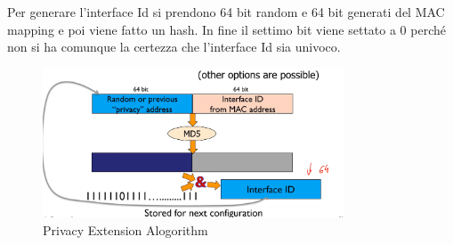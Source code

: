 \documentclass[12pt]{article}
\begin{document}
Per generare l'interface Id si prendono 64 bit random e 64 bit generati del MAC mapping e poi viene fatto un hash. In fine il settimo bit viene settato a 0 perch\'e non si ha comunque la certezza che l'interface Id sia univoco.
\begin{figure}[H]
    \centering
    \includegraphics[width=0.8\textwidth]{privacy-extension-alogorithm.png}
    \caption{Privacy Extension Alogorithm}
    \label{fig:privacy-extension-alogorithm}
\end{figure}
\end{document}
